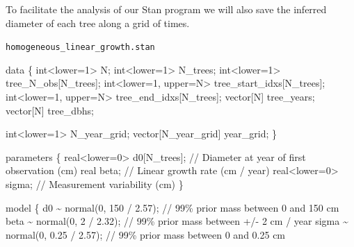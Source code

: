 \documentclass[
  letterpaper,
  DIV=11,
  numbers=noendperiod]{scrartcl}
\newenvironment{Shaded}{\begin{snugshade}}{\end{snugshade}}
\newcommand{\CommentTok}[1]{\textcolor[rgb]{0.37,0.37,0.37}{#1}}
\newcommand{\DataTypeTok}[1]{\textcolor[rgb]{0.68,0.00,0.00}{#1}}
\newcommand{\DecValTok}[1]{\textcolor[rgb]{0.68,0.00,0.00}{#1}}
\newcommand{\FloatTok}[1]{\textcolor[rgb]{0.68,0.00,0.00}{#1}}
\newcommand{\KeywordTok}[1]{\textcolor[rgb]{0.00,0.23,0.31}{#1}}
\newcommand{\NormalTok}[1]{\textcolor[rgb]{0.00,0.23,0.31}{#1}}
\begin{document}
To facilitate the analysis of our Stan program we will also save the
inferred diameter of each tree along a grid of times.

\begin{codelisting}

\caption{\texttt{homogeneous\_linear\_growth.stan}}

\begin{Shaded}
\begin{Highlighting}[]
\KeywordTok{data}\NormalTok{ \{}
  \DataTypeTok{int}\NormalTok{\textless{}}\KeywordTok{lower}\NormalTok{=}\DecValTok{1}\NormalTok{\textgreater{} N;}
  \DataTypeTok{int}\NormalTok{\textless{}}\KeywordTok{lower}\NormalTok{=}\DecValTok{1}\NormalTok{\textgreater{} N\_trees;}
  \DataTypeTok{int}\NormalTok{\textless{}}\KeywordTok{lower}\NormalTok{=}\DecValTok{1}\NormalTok{\textgreater{} tree\_N\_obs[N\_trees];}
  \DataTypeTok{int}\NormalTok{\textless{}}\KeywordTok{lower}\NormalTok{=}\DecValTok{1}\NormalTok{, }\KeywordTok{upper}\NormalTok{=N\textgreater{} tree\_start\_idxs[N\_trees];}
  \DataTypeTok{int}\NormalTok{\textless{}}\KeywordTok{lower}\NormalTok{=}\DecValTok{1}\NormalTok{, }\KeywordTok{upper}\NormalTok{=N\textgreater{} tree\_end\_idxs[N\_trees];}
  \DataTypeTok{vector}\NormalTok{[N] tree\_years;}
  \DataTypeTok{vector}\NormalTok{[N] tree\_dbhs;}
  
  \DataTypeTok{int}\NormalTok{\textless{}}\KeywordTok{lower}\NormalTok{=}\DecValTok{1}\NormalTok{\textgreater{} N\_year\_grid;}
  \DataTypeTok{vector}\NormalTok{[N\_year\_grid] year\_grid;}
\NormalTok{\}}

\KeywordTok{parameters}\NormalTok{ \{}
  \DataTypeTok{real}\NormalTok{\textless{}}\KeywordTok{lower}\NormalTok{=}\DecValTok{0}\NormalTok{\textgreater{} d0[N\_trees]; }\CommentTok{// Diameter at year of first observation (cm)}
  \DataTypeTok{real}\NormalTok{ beta;                 }\CommentTok{// Linear growth rate (cm / year)}
  \DataTypeTok{real}\NormalTok{\textless{}}\KeywordTok{lower}\NormalTok{=}\DecValTok{0}\NormalTok{\textgreater{} sigma;       }\CommentTok{// Measurement variability (cm)}
\NormalTok{\}}

\KeywordTok{model}\NormalTok{ \{}
\NormalTok{  d0 \textasciitilde{} normal(}\DecValTok{0}\NormalTok{, }\DecValTok{150}\NormalTok{ / }\FloatTok{2.57}\NormalTok{);     }\CommentTok{// 99\% prior mass between 0 and 150 cm}
\NormalTok{  beta \textasciitilde{} normal(}\DecValTok{0}\NormalTok{, }\DecValTok{2}\NormalTok{ / }\FloatTok{2.32}\NormalTok{);     }\CommentTok{// 99\% prior mass between +/{-} 2 cm / year}
\NormalTok{  sigma \textasciitilde{} normal(}\DecValTok{0}\NormalTok{, }\FloatTok{0.25}\NormalTok{ / }\FloatTok{2.57}\NormalTok{); }\CommentTok{// 99\% prior mass between 0 and 0.25 cm }
  

\end{Highlighting}
\end{Shaded}
\end{codelisting}
\end{document}
